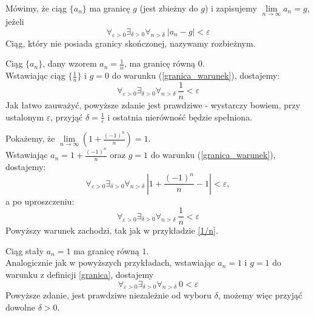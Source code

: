 \begin{definicja}\label{granica}
Mówimy, że ciąg $\{a_n\}$ ma granicę $g$ (jest zbieżny do $g$) i zapisujemy $\lim\limits_{n \to \infty} a_n = g$, jeżeli
\begin{equation}\label{granica_warunek}
\forall_{\varepsilon >0}\exists_{\delta>0}\forall_{n>\delta}\ |a_n-g|<\varepsilon
\end{equation}
Ciąg, który nie posiada granicy skończonej, nazywamy rozbieżnym.
\end{definicja}
\begin{przyklad}\label{1/n}
Ciąg $\{a_n\}$, dany wzorem $a_n=\frac{1}{n}$, ma granicę równą $0$. \\
Wstawiając ciąg $\{\frac{1}{n}\}$ i $g=0$ do warunku (\ref{granica_warunek}), dostajemy:
\begin{displaymath}
\forall_{\varepsilon >0}\exists_{\delta>0}\forall_{n>\delta}\ \frac{1}{n}<\varepsilon
\end{displaymath}
Jak łatwo zauważyć, powyższe zdanie jest prawdziwe - wystarczy bowiem, przy ustalonym $\varepsilon$, przyjąć $\delta=\frac{1}{\varepsilon}$ i ostatnia nierówność będzie spełniona. 
\end{przyklad}
\begin{przyklad}
Pokażemy, że $\lim\limits_{n \to \infty}(1+\frac{(-1)^n}{n})=1$.\\
Wstawiając $a_n=1+\frac{(-1)^n}{n}$ oraz $g=1$ do warunku (\ref{granica_warunek}), dostajemy:
\begin{displaymath}
\forall_{\varepsilon >0}\exists_{\delta>0}\forall_{n>\delta}\ |1+\frac{(-1)^n}{n}-1|<\varepsilon,
 \end{displaymath}
a po uproszczeniu:
\begin{displaymath}
\forall_{\varepsilon >0}\exists_{\delta>0}\forall_{n>\delta}\ \frac{1}{n}<\varepsilon
\end{displaymath}
Powyższy warunek zachodzi, tak jak w przykładzie \ref{1/n}.
\end{przyklad}
\begin{przyklad}
Ciąg stały $a_n=1$ ma granicę równą $1$.\\
Analogicznie jak w powyższych przykładach, wstawiając $a_n=1$ i $g=1$ do warunku z definicji \ref{granica}, dostajemy
\begin{displaymath}
\forall_{\varepsilon >0}\exists_{\delta>0}\forall_{n>\delta}\ 0<\varepsilon
\end{displaymath}
Powyższe zdanie, jest prawdziwe niezależnie od wyboru $\delta$, możemy więc przyjąć dowolne $\delta>0$.
\end{przyklad}
